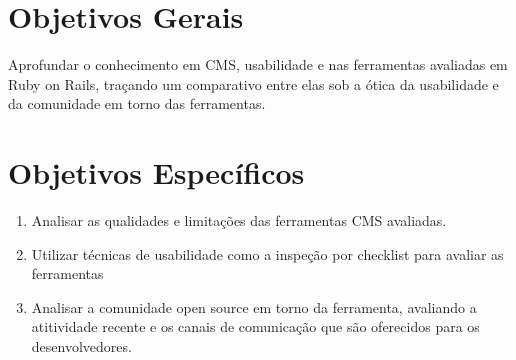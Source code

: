 \section{Objetivos Gerais}

Aprofundar o conhecimento em CMS, usabilidade e nas ferramentas avaliadas em Ruby on Rails, traçando um comparativo entre elas sob a ótica da usabilidade e da comunidade em torno das ferramentas.

\section{Objetivos Específicos}

\begin{enumerate}

\item Analisar as qualidades e limitações das ferramentas CMS avaliadas.
\item Utilizar técnicas de usabilidade como a inspeção por checklist para avaliar as ferramentas
\item Analisar a comunidade open source em torno da ferramenta, avaliando a atitividade recente e os canais de comunicação que são oferecidos para os desenvolvedores.


\end{enumerate}
